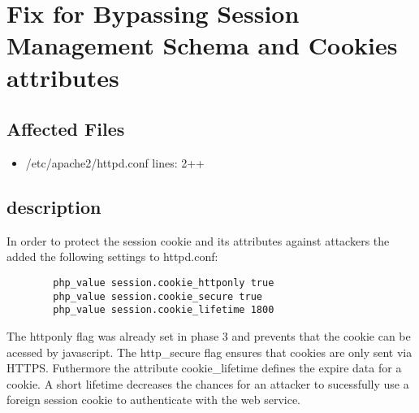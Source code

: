 \chapter{Fix for Bypassing Session Management Schema and Cookies attributes}
\section{Affected Files}

\begin{itemize}
\item /etc/apache2/httpd.conf lines: 2++
\end{itemize}

\section{description}
In order to protect the session cookie and its attributes against attackers the added the following settings to httpd.conf:

\begin{lstlisting}
	    php_value session.cookie_httponly true
	    php_value session.cookie_secure true
	    php_value session.cookie_lifetime 1800
\end{lstlisting}

The httponly flag was already set in phase 3 and prevents that the cookie can be acessed by javascript.
The http_secure flag ensures that cookies are only sent via HTTPS. \newline
Futhermore the attribute cookie_lifetime defines the expire data for a cookie. A short lifetime decreases the chances for an attacker to sucessfully use a foreign session cookie to authenticate with the web service.


